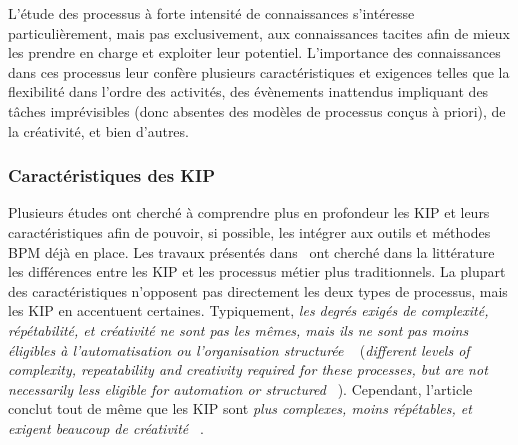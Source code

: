 L'étude des processus à forte intensité de connaissances s'intéresse particulièrement, mais pas exclusivement, aux connaissances tacites afin de mieux les prendre en charge et exploiter leur potentiel.
L'importance des connaissances dans ces processus leur confère plusieurs caractéristiques et exigences telles que la flexibilité dans l'ordre des activités, des évènements inattendus impliquant des tâches imprévisibles (donc absentes des modèles de processus conçus à priori), de la créativité, et bien d'autres.

\bigskip

\subsubsection{Caractéristiques des KIP}
\label{subsubsection:Contexte:KIP-RevueLitterature:KIP:CaracteristiquesKIP}

Plusieurs études ont cherché à comprendre plus en profondeur les KIP et leurs caractéristiques afin de pouvoir, si possible, les intégrer aux outils et méthodes BPM déjà en place.
Les travaux présentés dans~\cite{icsik2013practices} ont cherché dans la littérature les différences entre les KIP et les processus métier plus traditionnels.
La plupart des caractéristiques n'opposent pas directement les deux types de processus, mais les KIP en accentuent certaines.
Typiquement, \og \textit{les degrés exigés de complexité, répétabilité, et créativité ne sont pas les mêmes, mais ils ne sont pas moins éligibles à l'automatisation ou l'organisation structurée} \fg~\cite{icsik2013practices} (\og \textit{different levels of complexity, repeatability and creativity required for these processes, but are not necessarily less eligible for automation or structured} \fg~\cite{icsik2013practices}).
Cependant, l'article conclut tout de même que les KIP sont \og \textit{plus complexes, moins répétables, et exigent beaucoup de créativité} \fg~\cite{icsik2013practices}.

\bigskip

